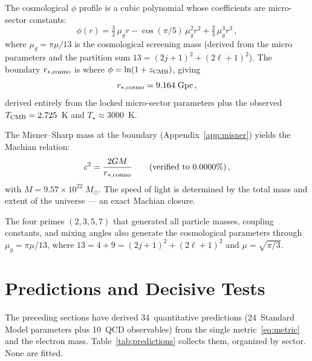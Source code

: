 \documentclass[aps,prd,twocolumn,superscriptaddress,nofootinbib,longbibliography]{revtex4-2}
\newcommand{\mug}{\mu_g}
\begin{document}
The cosmological $\phi$ profile is a cubic polynomial whose
coefficients are micro-sector constants:
\begin{equation}
  \phi(r) = \tfrac{3}{2}\,\mug r
  - \cos(\pi/5)\,\mug^2 r^2
  + \tfrac{2}{3}\,\mug^3 r^3\,,
\end{equation}
where $\mug = \pi\mu/13$ is the cosmological screening mass (derived
from the micro parameters and the partition sum
$13 = (2j+1)^2 + (2\ell+1)^2$).  The boundary $r_{*,\rm cosmo}$
is where $\phi = \ln(1 + z_{\rm CMB})$, giving
\begin{equation}
  r_{*,\rm cosmo} = 9.164\;\text{Gpc}\,,
\end{equation}
derived entirely from the locked micro-sector parameters plus the
observed $T_{\rm CMB} = 2.725$~K and $T_\star \approx 3000$~K.

The Misner--Sharp mass at the boundary
(Appendix~\ref{app:misner}) yields the Machian relation:
\begin{equation}\label{eq:machian}
  c^2 = \frac{2GM}{r_{*,\rm cosmo}}
  \qquad(\text{verified to }0.0000\%)\,,
\end{equation}
with $M = 9.57 \times 10^{22}\;M_\odot$.  The speed of light is
determined by the total mass and extent of the universe --- an exact
Machian closure.

The four primes $(2, 3, 5, 7)$ that generated all particle masses,
coupling constants, and mixing angles also generate the cosmological
parameters through $\mug = \pi\mu/13$, where
$13 = 4 + 9 = (2j+1)^2 + (2\ell+1)^2$ and
$\mu = \sqrt{\pi/3}$.

\section{Predictions and Decisive Tests}\label{sec:falsify}

The preceding sections have derived 34~quantitative predictions
(24~Standard Model parameters plus 10~QCD observables) from the
single metric~\eqref{eq:metric} and the electron mass.
Table~\ref{tab:predictions} collects them, organized by sector.  None
are fitted.
\end{document}
